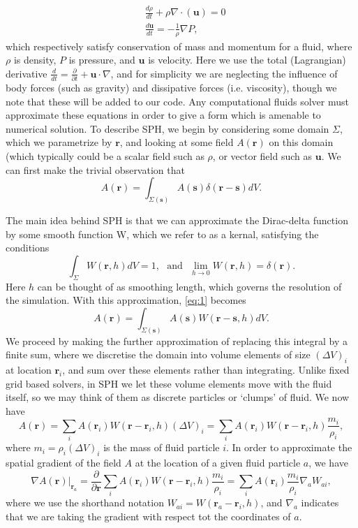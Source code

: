\documentclass[11pt]{article}
\begin{document}
\begin{align}
&\frac{d\rho}{d t} + \rho\nabla \cdot  \left( \bm{u}\right)=0\label{eq:NSE1}\\
&\frac{d\bm{u}}{d t}=-\frac{1}{\rho}\nabla P\label{eq:NSE2},
\end{align}
which respectively satisfy conservation of mass and momentum for a fluid, where $\rho$ is density, $P$ is pressure, and $\bm{u}$ is velocity. Here we use the total (Lagrangian) derivative $\frac{d}{dt} = \frac{\partial}{\partial t} + \bm{u} \cdot \nabla $, and for simplicity we are neglecting the influence of body forces (such as gravity) and dissipative forces (i.e. viscosity), though we note that these will be added to our code. Any computational fluids solver must approximate these  equations in order to give a form which is amenable to numerical solution. To describe SPH, we begin by considering some domain $\Sigma$, which we parametrize by $\bm{r}$, and looking at some field $A(\bm{r})$ on this domain (which typically could be a scalar field such as $\rho$, or vector field such as $\bm{u}$.  We can first make the trivial observation that
\begin{equation}
\label{eq:1}
 A(\bm{r}) = \int_{\Sigma(\bm{s})} A(\bm{s}) \delta(\bm{r}-\bm{s}) dV.
\end{equation}

The main idea behind SPH is that we can approximate the Dirac-delta function by some smooth function W, which we refer to as a kernal, satisfying the conditions
$$  \int_{\Sigma} W(\bm{r}, h) dV = 1, \ \ \ \text{and} \ \ \    \lim_{h \rightarrow 0} W(\bm{r}, h) = \delta(\bm{r}). $$
Here $h$ can be thought of as  smoothing length, which governs the resolution of the simulation. With this approximation, \ref{eq:1} becomes
\begin{equation}
\label{eq:2}
 A(\bm{r}) = \int_{\Sigma(\bm{s})} A(\bm{s}) W(\bm{r}-\bm{s},h) dV.
\end{equation}
We proceed by making the further approximation of replacing this integral by a finite sum, where we discretise the domain into volume elements of size $(\Delta V)_i$ at location $\bm{r}_i$, and sum over these elements rather than integrating. Unlike fixed grid based solvers, in SPH we let these volume elements  move with the fluid itself, so we may think of them as discrete particles or `clumps' of fluid. We now have 
\begin{equation}
\label{eq:3}
 A(\bm{r}) = \sum_{i} A(\bm{r}_i) W(\bm{r}-\bm{r}_i,h) (\Delta V)_i = \sum_{i} A(\bm{r}_i) W(\bm{r}-\bm{r}_i,h) \frac{m_i}{\rho_i},
\end{equation}
where $m_i = \rho_i (\Delta V)_i$ is the mass of fluid particle $i$. In order to approximate the spatial gradient of the field $A$ at the location of a given fluid particle $a$, we have
\begin{equation}
\label{eq:gradient}
\nabla A(\bm{r})|_{\bm{r}_a} = \frac{\partial}{\partial \bm{r}} \sum_{i} A(\bm{r}_i) W(\bm{r}-\bm{r}_i,h) \frac{m_i}{\rho_i} = \sum_{i} A(\bm{r}_i) \frac{m_i}{\rho_i} \nabla_a W_{ai},
\end{equation}
where we use the shorthand notation $W_{ai} = W(\bm{r}_a - \bm{r}_i,h)$, and $\nabla_a$ indicates that we are taking the gradient with respect tot the coordinates of $a$.
\end{document}
